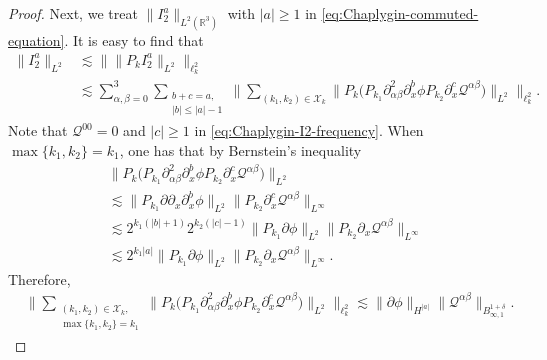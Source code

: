 \documentclass[10pt,a4paper]{amsart}
\def\cQ{\mathcal Q}
\def\ls{\lesssim}
\begin{document}
\begin{proof}
		
		Next, we treat $\|I_2^a\|_{L^2(\mathbb R^3)}$ with $|a|\ge1$ in
		\eqref{eq:Chaplygin-commuted-equation}. It is easy to find that
		\begin{equation}\label{eq:Chaplygin-I2-frequency}
			\begin{aligned}
				\|I_2^a\|_{L^2}
				&\ls
				\big\|
				\|P_kI_2^a\|_{L^2}
				\big\|_{\ell_k^2}\\
				&\ls
				\sum_{\alpha,\beta=0}^3
				\sum_{\substack{b+c=a,\\ |b|\le |a|-1}}
				\big\|
				\sum_{(k_1,k_2)\in\mathcal X_k}
				\big\|
				P_k
				\big(
				P_{k_1}\partial_{\alpha\beta}^2\partial_x^b\phi
				P_{k_2}\partial_x^c\cQ^{\alpha\beta}
				\big)
				\big\|_{L^2}
				\big\|_{\ell_k^2}.
			\end{aligned}
		\end{equation}
		Note that $\cQ^{00}=0$ and $|c|\ge1$ in \eqref{eq:Chaplygin-I2-frequency}. When
		$\max\{k_1,k_2\}=k_1$, one has that by Bernstein's inequality
		\begin{equation}\label{eq:Chaplygin-I2-first-frequency-case}
			\begin{aligned}
				&
				\big\|
				P_k
				\big(
				P_{k_1}\partial_{\alpha\beta}^2\partial_x^b\phi
				P_{k_2}\partial_x^c\cQ^{\alpha\beta}
				\big)
				\big\|_{L^2}
				\\
				&\ls
				\|P_{k_1}\partial\partial_x\partial_x^b\phi\|_{L^2}
				\|P_{k_2}\partial_x^c\cQ^{\alpha\beta}\|_{L^\infty}
				\\
				&\ls
				2^{k_1(|b|+1)}
				2^{k_2(|c|-1)}
				\|P_{k_1}\partial\phi\|_{L^2}
				\|P_{k_2}\partial_x\cQ^{\alpha\beta}\|_{L^\infty}
				\\
				&\ls
				2^{k_1|a|}
				\|P_{k_1}\partial\phi\|_{L^2}
				\|P_{k_2}\partial_x\cQ^{\alpha\beta}\|_{L^\infty}.
			\end{aligned}
		\end{equation}
		Therefore,
		\begin{equation}\label{eq:Chaplygin-I2-first-frequency-sum}
			\begin{aligned}
				&
				\big\|
				\sum_{\substack{(k_1,k_2)\in\mathcal X_k,\\
				\max\{k_1,k_2\}=k_1}}
				\big\|
				P_k
				\big(
				P_{k_1}\partial_{\alpha\beta}^2\partial_x^b\phi
				P_{k_2}\partial_x^c\cQ^{\alpha\beta}
				\big)
				\big\|_{L^2}
				\big\|_{\ell_k^2}
				\ls
				\|\partial\phi\|_{H^{|a|}}
				\|\cQ^{\alpha\beta}\|_{B_{\infty,1}^{1+\delta}}.
			\end{aligned}
		\end{equation}

\end{proof}
\end{document}

